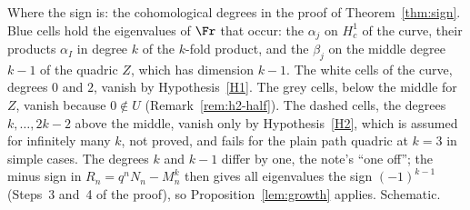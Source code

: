\caption{Where the sign is: the cohomological degrees in the proof of
Theorem~\ref{thm:sign}. Blue cells hold the eigenvalues of $\Fr$ that occur:
the $\alpha_j$ on $H^1_c$ of the curve, their products $\alpha_I$ in degree
$k$ of the $k$-fold product, and the $\beta_j$ on the middle degree $k-1$ of
the quadric $Z$, which has dimension ${k-1}$. The white cells of the curve,
degrees $0$ and $2$, vanish by Hypothesis~\ref{H1}. The grey cells, below the
middle for $Z$, vanish because $0\notin U$ (Remark~\ref{rem:h2-half}). The dashed cells, the degrees $k,\dots,2k-2$ above
the middle, vanish only by Hypothesis~\ref{H2}, which is assumed for
infinitely many $k$, not proved, and fails for the plain path quadric at
$k=3$ in simple cases. The degrees $k$ and $k-1$ differ by one, the note's
``one off''; the minus sign in $R_n=q^nN_n-M_n^k$ then gives all
eigenvalues the sign $(-1)^{k-1}$ (Steps~3 and~4 of the proof), so
Proposition~\ref{lem:growth} applies. Schematic.}
\label{fig:sign-degrees}

